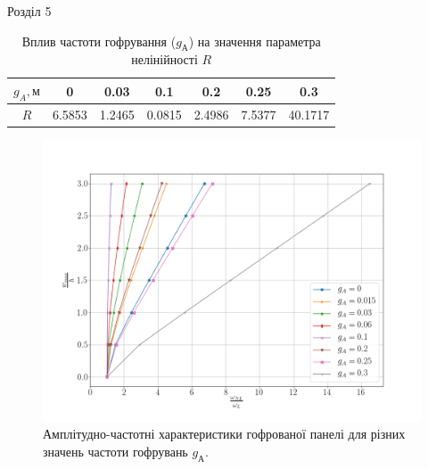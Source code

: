 \documentclass[8pt]{beamer}
\numberwithin{figure}{section}
\numberwithin{equation}{section}
\numberwithin{table}{section}
\begin{document}
\begin{frame}{Розділ 5}

\begin{table}[h!]
\centering
 \begin{tabular}{| c | c | c | c | c | c | c |} 
 \hline
 $g_A, м$ & 0 & 0.03 & 0.1 & 0.2 & 0.25 & 0.3 \\ 
  \hline
 $R$ & 6.5853 & 1.2465 & 0.0815 & 2.4986 & 7.5377 & 40.1717 \\
   \hline
\end{tabular}
\caption{Вплив частоти гофрування ($g_А$) на значення параметра нелінійності $R$}
\label{table:4}
\end{table}
\begin{figure}
	\includegraphics[scale=0.21]{pic/corrugated_ampl_nonlinear_s.png}
		\caption{Амплітудно-частотні характеристики гофрованої панелі для різних значень частоти гофрувань $g_А$.}
\end{figure}

\end{frame}
\end{document}

